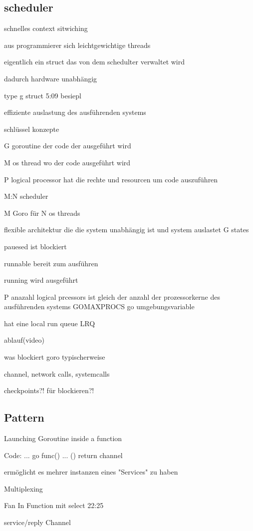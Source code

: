 \documentclass[fontsize=12pt,paper=a4,twoside=semi,parskip=half-,headsepline,headinclude]{scrreprt}
\begin{document}
\subsection{scheduler}
schnelles context sitwiching

aus programmierer sich leichtgewichtige threads

eigentlich ein struct das von dem schedulter verwaltet wird

dadurch hardware unabhängig

type g struct 5:09 besiepl

effiziente auslastung des ausführenden systems

schlüssel konzepte

G goroutine der code der ausgeführt wird

M os thread wo der code ausgeführt wird

P logical processor hat die rechte und resourcen um code auszuführen

M:N scheduler

M Goro für N os threads

flexible architektur die die system unabhängig ist und system auslastet
G states

pauesed ist blockiert

runnable bereit zum ausführen

running wird ausgeführt

P anazahl logical prcessors ist gleich der anzahl der prozessorkerne des ausführenden systems GOMAXPROCS go umgebungsvariable

hat eine local run queue LRQ

ablauf(video)

was blockiert goro typischerweise

channel, network calls, systemcalls

checkpoints?! für blockieren?!

\subsection{Pattern}

Launching Goroutine inside a function

Code:
...
go func() {
	...
}()
return channel

ermöglicht es mehrer instanzen eines "Services" zu haben

Multiplexing

Fan In Function mit select 22:25

service/reply Channel
\end{document}
